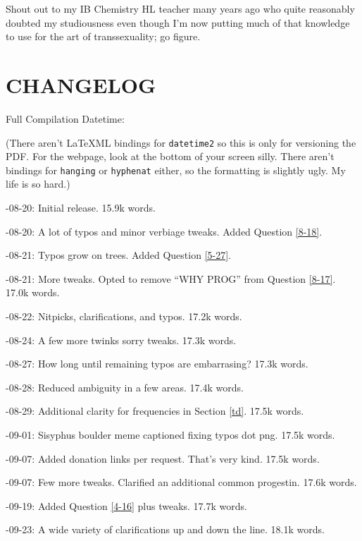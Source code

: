 \documentclass{article}
\begin{document}
Shout out to my IB Chemistry HL teacher many years ago who quite reasonably doubted my studiousness even though I’m now putting much of that knowledge to use for the art of transsexuality; go figure. 

 

\section*{CHANGELOG}

\noindent Full Compilation Datetime: \DTMnow

\noindent(There aren't LaTeXML bindings for \texttt{datetime2} so this is only for versioning the PDF. For the webpage, look at the bottom of your screen silly. There aren't bindings for \texttt{hanging} or \texttt{hyphenat} either, so the formatting is slightly ugly. My life is so hard.)

-08-20: Initial release. 15.9k words.

-08-20: A lot of typos and minor verbiage tweaks. Added Question \ref{8-18}.

-08-21: Typos grow on trees. Added Question \ref{5-27}.

-08-21: More tweaks. Opted to remove “WHY PROG” from Question \ref{8-17}. 17.0k words.

-08-22: Nitpicks, clarifications, and typos. 17.2k words.

-08-24: A few more twinks sorry tweaks. 17.3k words.

-08-27: How long until remaining typos are embarrasing? 17.3k words.

-08-28: Reduced ambiguity in a few areas. 17.4k words.

-08-29: Additional clarity for frequencies in Section \ref{td}. 17.5k words.

-09-01: Sisyphus boulder meme captioned fixing typos dot png. 17.5k words.

-09-07: Added donation links per request. That's very kind. 17.5k words.

-09-07: Few more tweaks. Clarified an additional common progestin. 17.6k words.

-09-19: Added Question \ref{4-16} plus tweaks. 17.7k words.

-09-23: A wide variety of clarifications up and down the line. 18.1k words.
\end{document}
